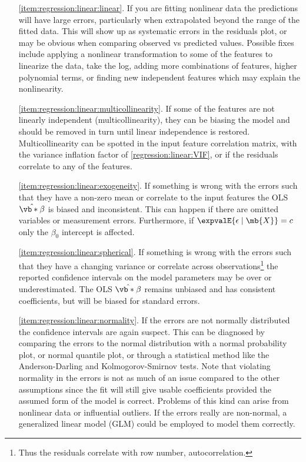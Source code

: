 \begin{itemize}[noitemsep]
  \item[\cref{item:regression:linear:linear}.] If you are fitting nonlinear data the predictions will have large errors,
particularly when extrapolated beyond the range of the fitted data.
This will show up as systematic errors in the residuals plot,
or may be obvious when comparing observed vs predicted values.
Possible fixes include applying a nonlinear transformation to some of the features to linearize the data, \eg take the log,
adding more combinations of features, \eg higher polynomial terms,
or finding new independent features which may explain the nonlinearity.

  \item[\cref{item:regression:linear:multicollinearity}.] If some of the features are not linearly independent (multicollinearity),
they can be biasing the model and should be removed in turn until linear independence is restored.
Multicollinearity can be spotted in the input feature correlation matrix,
with the variance inflation factor of \cref{regression:linear:VIF},
or if the residuals correlate to any of the features.

  \item[\cref{item:regression:linear:exogeneity}.] If something is wrong with the errors
such that they have a non-zero mean or correlate to the input features
the OLS $\hat{\vb*{\beta}}$ is biased and inconsistent.
This can happen if there are omitted variables or measurement errors.
Furthermore, if $\expvalE{\epsilon \mid \mb{X}} = c$ only the $\beta_{0}$ intercept is affected.

  \item[\cref{item:regression:linear:spherical}.] If something is wrong with the errors
such that they have a changing variance or correlate across observations\footnote{Thus the residuals correlate with row number, \ie autocorrelation.}
the reported confidence intervals on the model parameters may be over or underestimated.
The OLS $\hat{\vb*{\beta}}$ remains unbiased and has consistent coefficients, but will be biased for standard errors.

  \item[\cref{item:regression:linear:normality}.] If the errors are not normally distributed the confidence intervals are again suspect.
This can be diagnosed by comparing the errors to the normal distribution with a normal probability plot, or normal quantile plot,
or through a statistical method like the Anderson-Darling and Kolmogorov-Smirnov tests.
Note that violating normality in the errors is not as much of an issue compared to the other assumptions
since the fit will still give usable coefficients provided the assumed form of the model is correct.
Problems of this kind can arise from nonlinear data or influential outliers.
If the errors really are non-normal, a generalized linear model (GLM) could be employed to model them correctly.
\end{itemize}

